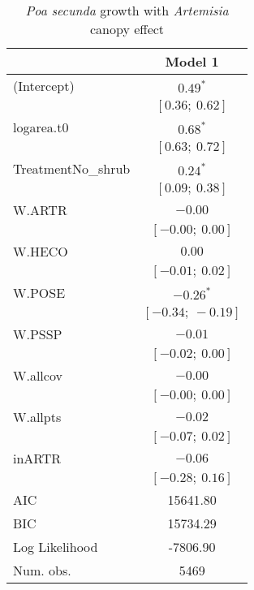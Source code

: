 \documentclass[11pt]{article}
\begin{document}
\begin{table}
\caption{\textit{Poa secunda} growth with \textit{Artemisia} canopy effect}
\begin{center}
\begin{tabular}{l c }
\hline
 & Model 1 \\
\hline
(Intercept)                      & $0.49^{*}$        \\
                                 & $[0.36;\ 0.62]$   \\
logarea.t0                       & $0.68^{*}$        \\
                                 & $[0.63;\ 0.72]$   \\
TreatmentNo\_shrub               & $0.24^{*}$        \\
                                 & $[0.09;\ 0.38]$   \\
W.ARTR                           & $-0.00$           \\
                                 & $[-0.00;\ 0.00]$  \\
W.HECO                           & $0.00$            \\
                                 & $[-0.01;\ 0.02]$  \\
W.POSE                           & $-0.26^{*}$       \\
                                 & $[-0.34;\ -0.19]$ \\
W.PSSP                           & $-0.01$           \\
                                 & $[-0.02;\ 0.00]$  \\
W.allcov                         & $-0.00$           \\
                                 & $[-0.00;\ 0.00]$  \\
W.allpts                         & $-0.02$           \\
                                 & $[-0.07;\ 0.02]$  \\
inARTR                           & $-0.06$           \\
                                 & $[-0.28;\ 0.16]$  \\
\hline
AIC                              & 15641.80          \\
BIC                              & 15734.29          \\
Log Likelihood                   & -7806.90          \\
Num. obs.                        & 5469              \\

\end{tabular}
\end{center}
\end{table}
\end{document}
